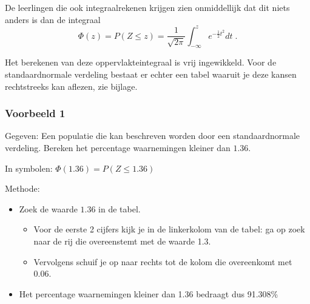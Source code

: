 \documentclass[12pt,twoside,a4paper]{article}
\begin{document}
\begin{center}
\end{center}

De leerlingen die ook integraalrekenen krijgen zien onmiddellijk dat dit niets anders is dan de integraal
$$\Phi(z)=P(Z\leq z)=\dfrac{1}{\sqrt{2\pi}}\int_{-\infty}^{z}e^{-\frac{1}{2}t^2}dt\;.$$

Het berekenen van deze oppervlakteintegraal is vrij ingewikkeld. Voor de standaardnormale verdeling bestaat er echter een tabel waaruit je deze kansen rechtstreeks kan aflezen, zie bijlage.

\subsubsection*{Voorbeeld 1}

Gegeven: Een populatie die kan beschreven worden door een standaardnormale verdeling. Bereken het percentage waarnemingen kleiner dan $1.36$.

In symbolen: $\Phi(1.36)=P(Z\leq 1.36)$

Methode:
\begin{itemize}
  \item Zoek de waarde $1.36$ in de tabel.
  \begin{itemize}
    \item Voor de eerste 2 cijfers kijk je in de linkerkolom van de tabel: ga op zoek naar de rij die overeenstemt met de waarde 1.3.
    \item Vervolgens schuif je op naar rechts tot de kolom die overeenkomt met 0.06.
  \end{itemize}
  \item Het percentage waarnemingen kleiner dan 1.36 bedraagt dus 91.308\%
\end{itemize}
\end{document}
